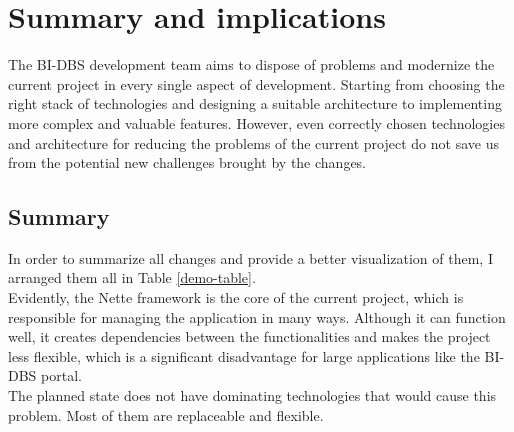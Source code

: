 \section{Summary and implications} The BI-DBS development team aims to dispose of problems and modernize the current project in every single aspect of development. Starting from choosing the right stack of technologies and designing a suitable architecture to implementing more complex and valuable features. However, even correctly chosen technologies and architecture for reducing the problems of the current project do not save us from the potential new challenges brought by the changes. 


\subsection{Summary} 
In order to summarize all changes and provide a better visualization of them, I arranged them all in Table \ref{demo-table}.\\
Evidently, the Nette framework is the core of the current project, which is responsible for managing the application in many ways. Although it can function well, it creates dependencies between the functionalities and makes the project less flexible, which is a significant disadvantage for large applications like the BI-DBS portal.\\
The planned state does not have dominating technologies that would cause this problem. Most of them are replaceable and flexible.





